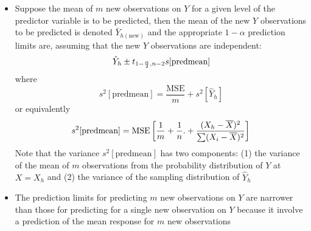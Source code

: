\begin{itemize}
\item Suppose the mean of $m$ new observations on $Y$ for a given level of the predictor variable is to be predicted, then the mean of the new $Y$ observations to be predicted is denoted $\bar{Y}_{h(\text{new})}$ and the appropriate $1-\alpha$ prediction limits are, assuming that the new $Y$ observations are independent: $$ \hat{Y}_h \pm t_{1 - \frac{\alpha}{2}, n-2}s[\text{predmean}] $$ where $$ s^2[\text{predmean}] = \frac{\text{MSE}}{m} + s^2[\hat{Y}_h] $$ or equivalently $$ s^2[\text{predmean}] = \text{MSE}\left[ \frac{1}{m} + \frac{1}{n}. + \frac{(X_h - \overline{X})^2}{\sum (X_i - \overline{X})^2}\right] $$ Note that the variance $s^2[\text{predmean}]$ has two components: (1) the variance of the mean of $m$ observations from the probability distribution of $Y$ at $X=X_h$ and (2) the variance of the sampling distribution of $\hat{Y}_h$ 
\item The prediction limits for predicting $m$ new observations on $Y$ are narrower than those for predicting for a single new observation on $Y$ because it involve a prediction of the mean response for $m$ new observations
\end{itemize}

